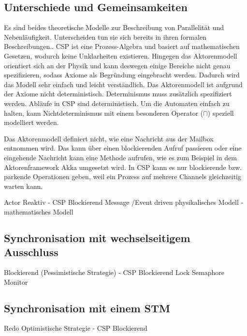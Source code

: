 \subsection{Unterschiede und Gemeinsamkeiten}
Es sind beides theoretische Modelle zur Beschreibung von Parallelität und Nebenläufigkeit. Unterscheiden tun sie sich bereits in ihren formalen Beschreibungen..
\ac{CSP} ist eine Prozess-Algebra und basiert auf mathematischen Gesetzen, wodurch keine Unklarheiten existieren. Hingegen das Aktorenmodell orientiert sich an der Physik und kann deswegen einige Bereiche nicht genau spezifizieren, sodass Axiome als Begründung eingebracht werden. Dadurch wird das Modell sehr einfach und leicht verständlich. Das Aktorenmodell ist aufgrund der Axiome nicht deterministisch. Determinismus muss zusätzlich spezifiziert werden. Abläufe in \ac{CSP} sind deterministisch. Um die Automaten einfach zu halten, kann Nichtdeterminismus mit einem besonderen Operator ($\sqcap$) speziell modelliert werden.

Das Aktorenmodell definiert nicht, wie eine Nachricht aus der Mailbox entnommen wird. Das kann über einen blockierenden Aufruf passieren oder eine eingehende Nachricht kann eine Methode aufrufen, wie es zum Beispiel in dem Aktorenframework Akka umgesetzt wird. In \ac{CSP} kann es nur blockierende bzw. parkende Operationen geben, weil ein Prozess auf mehrere Channels gleichzeitig warten kann.




Actor Reaktiv - CSP Blockierend
Message /Event driven
physikalisches Modell - mathematisches Modell

\subsection{Synchronisation mit wechselseitigem Ausschluss}
Blockierend (Pessimistische Strategie) - CSP Blockierend
Lock
Semaphore
Monitor

\subsection{Synchronisation mit einem \acs{STM}}
Redo Optimistische Strategie - CSP Blockierend
